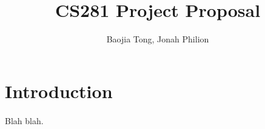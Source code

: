 \documentclass[11pt]{amsart}
\title{CS281 Project Proposal}
\author{Baojia Tong,  Jonah Philion}
\date{}                                           %
\begin{document}
\maketitle

\section{Introduction}
\paragraph{} Blah blah.
\end{document}
